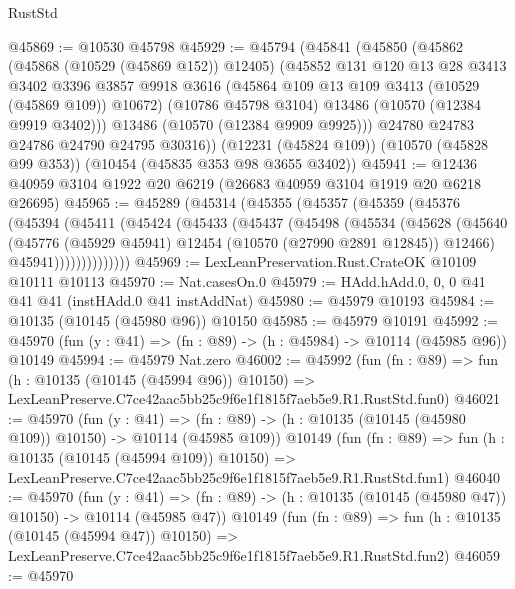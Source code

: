 \begin{lexlean}{RustStd}
\begin{coremodule}
@45869 := @10530 @45798
@45929 := @45794
    (@45841
      (@45850
        (@45862
          (@45868 (@10529 (@45869 @152)) @12405)
          (@45852
            @131
            @120
            @13
            @28
            @3413
            @3402
            @3396
            @3857
            @9918
            @3616
            (@45864 @109 @13 @109 @3413 (@10529 (@45869 @109)) @10672)
            (@10786 @45798 @3104)
            @13486
            (@10570 (@12384 @9919 @3402)))
          @13486
          (@10570 (@12384 @9909 @9925)))
        @24780
        @24783
        @24786
        @24790
        @24795
        @30316))
    (@12231 (@45824 @109))
    (@10570 (@45828 @99 @353))
    (@10454 (@45835 @353 @98 @3655 @3402))
@45941 := @12436 @40959 @3104 @1922 @20 @6219 (@26683 @40959 @3104 @1919 @20 @6218 @26695)
@45965 := @45289
    (@45314
      (@45355
        (@45357
          (@45359
            (@45376
              (@45394
                (@45411
                  (@45424
                    (@45433
                      (@45437
                        (@45498
                          (@45534
                            (@45628
                              (@45640
                                (@45776
                                  (@45929 @45941)
                                  @12454
                                  (@10570 (@27990 @2891 @12845))
                                  @12466)
                                @45941))))))))))))))
@45969 := LexLeanPreservation.Rust.CrateOK @10109 @10111 @10113
@45970 := Nat.casesOn.{0}
@45979 := HAdd.hAdd.{0, 0, 0} @41 @41 @41 (instHAdd.{0} @41 instAddNat)
@45980 := @45979 @10193
@45984 := @10135 (@10145 (@45980 @96)) @10150
@45985 := @45979 @10191
@45992 := @45970 (fun (y : @41) => (fn : @89) -> (h : @45984) -> @10114 (@45985 @96)) @10149
@45994 := @45979 Nat.zero
@46002 := @45992
    (fun (fn : @89) =>
    fun (h : @10135 (@10145 (@45994 @96)) @10150) =>
    LexLeanPreserve.C7ce42aac5bb25c9f6e1f1815f7aeb5e9.R1.RustStd.fun0)
@46021 := @45970
    (fun (y : @41) =>
    (fn : @89) -> (h : @10135 (@10145 (@45980 @109)) @10150) -> @10114 (@45985 @109))
    @10149
    (fun (fn : @89) =>
    fun (h : @10135 (@10145 (@45994 @109)) @10150) =>
    LexLeanPreserve.C7ce42aac5bb25c9f6e1f1815f7aeb5e9.R1.RustStd.fun1)
@46040 := @45970
    (fun (y : @41) =>
    (fn : @89) -> (h : @10135 (@10145 (@45980 @47)) @10150) -> @10114 (@45985 @47))
    @10149
    (fun (fn : @89) =>
    fun (h : @10135 (@10145 (@45994 @47)) @10150) =>
    LexLeanPreserve.C7ce42aac5bb25c9f6e1f1815f7aeb5e9.R1.RustStd.fun2)
@46059 := @45970

\end{coremodule}
\end{lexlean}
